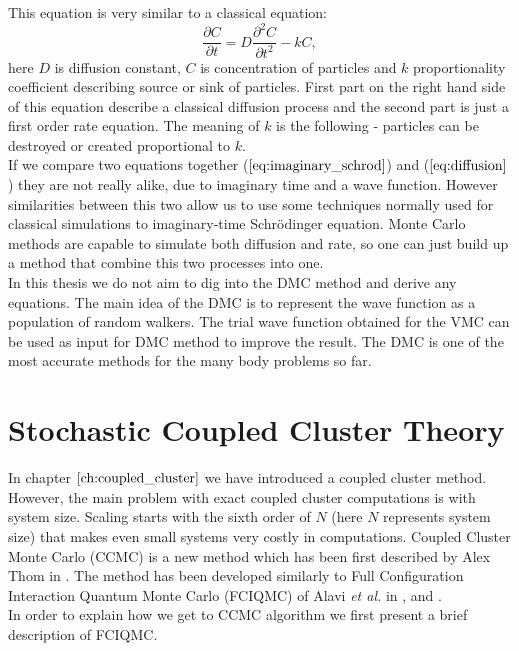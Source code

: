 \documentclass[twoside,english]{uiofysmaster}
\theoremstyle{definition}
\begin{document}
This equation is very similar to a classical equation:
\begin{equation}\label{eq:diffusion}
\frac{\partial C }{ \partial t} = D \frac{\partial^2 C }{ \partial t^2} - kC,
\end{equation}
here $D$ is diffusion constant, $C$ is concentration of particles and $k$ proportionality coefficient describing source or sink of particles. First part on the right hand side of this equation describe a classical diffusion process and the second part is just a first order rate equation. The meaning of $k$ is the following - particles can be destroyed or created proportional to $k$.\\
If we compare two equations together ($\ref{eq:imaginary_schrod}$) and ($\ref{eq:diffusion}$) they are not really alike, due to imaginary time and a wave function. However similarities between this two allow us to use some techniques normally used for classical simulations to imaginary-time Schr\"{o}dinger equation. Monte Carlo methods are capable to simulate both diffusion and rate, so one can just build up a method that combine this two processes into one. \\
In this thesis we do not aim to dig into the DMC method and derive any equations. The main idea of the DMC is to represent the wave function as a population of random walkers. The trial wave function obtained for the VMC can be used as input for DMC method to improve the result. The DMC is one of the most accurate methods for the many body problems so far.\\



\section{Stochastic Coupled Cluster Theory}
In chapter $\ref{ch:coupled_cluster}$ we have introduced a coupled cluster method. However, the main problem with exact coupled cluster computations is with system size. Scaling starts with the sixth order of $N$ (here $N$ represents system size) that makes even small systems very costly in computations. Coupled Cluster Monte Carlo (CCMC) is a new method which has been first described by Alex Thom in \cite{thomStochasticCoupledCluster2010}. The method has been developed similarly to Full Configuration Interaction Quantum Monte Carlo (FCIQMC) of Alavi \textit{et al.} in \cite{boothFermionMonteCarlo2009}, \cite{clelandCommunicationsSurvivalFittest2010} and \cite{boothApproachingChemicalAccuracy2010}.\\
In order to explain how we get to CCMC algorithm we first present a brief description of FCIQMC. \\
\end{document}

